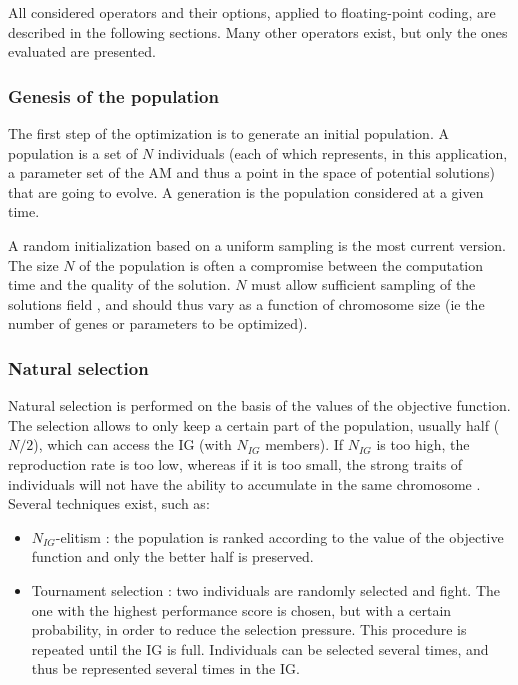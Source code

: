 \documentclass{ametsoc}
\begin{document}
All considered operators and their options, applied to floating-point coding, are described in the following sections. Many other operators exist, but only the ones evaluated are presented.

\subsubsection{Genesis of the population}

The first step of the optimization is to generate an initial population. A population is a set of $N$ individuals (each of which represents, in this application, a parameter set of the AM and thus a point in the space of potential solutions) that are going to evolve. A generation is the population considered at a given time. 

A random initialization based on a uniform sampling is the most current version. The size $N$ of the population is often a compromise between the computation time and the quality of the solution. $N$ must allow sufficient sampling of the solutions field \citep{Beasley1996a}, and should thus vary as a function of chromosome size (ie the number of genes or parameters to be optimized). 


\subsubsection{Natural selection}

Natural selection is performed on the basis of the values of the objective function. The selection allows to only keep a certain part of the population, usually half ($N/2$), which can access the IG (with $N_{IG}$ members). If $N_{IG}$ is too high, the reproduction rate is too low, whereas if it is too small, the strong traits of individuals will not have the ability to accumulate in the same chromosome \citep{Haupt2004}. Several techniques exist, such as:

\begin{itemize}
	\item $N_{IG}$-elitism \citep{Michalewicz1996}: the population is ranked according to the value of the objective function and only the better half is preserved. 
	
	\item Tournament selection \citep{Michalewicz1996, Zitzler2004a}: two individuals are randomly selected and fight. The one with the highest performance score is chosen, but with a certain probability, in order to reduce the selection pressure. This procedure is repeated until the IG is full. Individuals can be selected several times, and thus be represented several times in the IG.
\end{itemize}
\end{document}
